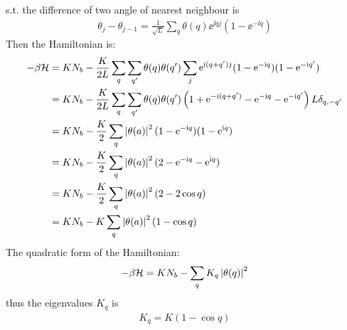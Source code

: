 \begin{solution}
\begin{enumerate}[(a)]
        s.t. the difference of two angle of nearest neighbour is 
        \begin{align*}
            \theta_j - \theta_{j-1} = \frac{1}{\sqrt{L}}\sum_q \theta(q) \ee^{\ii qj}(1- \ee^{- \ii q})
        \end{align*}
        Then the Hamiltonian is: 
        \begin{align*}
            - \beta \mathcal{H} &= K N_b - \frac{K}{2L}  \sum_{q} \sum_{q'} \theta(q) \theta(q') \sum_j \mathrm{e}^{\mathrm{i}(q+q')j} (1- \mathrm{e}^{-\mathrm{i} q}) (1-\mathrm{e}^{-\mathrm{i} q'}) \\
            &= K N_b - \frac{K}{2L} \sum_q \sum_{q'} \theta(q) \theta(q') \left( 1 + \mathrm{e}^{- \mathrm{i}(q+q')} - \mathrm{e}^{- \mathrm{i} q} - \mathrm{e}^{- \mathrm{i} q'} \right) L \delta_{q,-q'} \\
            &= K N_b - \frac{K}{2} \sum_q \left| \theta(a) \right|^2 (1-\mathrm{e}^{-\mathrm{i} q})(1- \mathrm{e}^{\mathrm{i} q}) \\
            &=K N_b - \frac{K}{2} \sum_q \left| \theta(a) \right|^2 (2 - \mathrm{e}^{- \mathrm{i} q} - \mathrm{e}^{\mathrm{i} q}) \\
            &= K N_b - \frac{K}{2} \sum_q \left| \theta(a) \right|^2 \left( 2 - 2 \cos q \right) \\
            &= K N_b - K \sum_q \left| \theta(a) \right|^2 \left(1- \cos q\right)
        \end{align*}
        The quadratic form of the Hamiltonian:
        \begin{align*}
            - \beta \mathcal{H} = K N_b - \sum_q K_q \left| \theta(q) \right|^2
        \end{align*}
        thus the eigenvalues $K_q$ is 
        \begin{align*}
            K_q = K (1- \cos q)
        \end{align*}
    \end{enumerate}
\end{solution}

